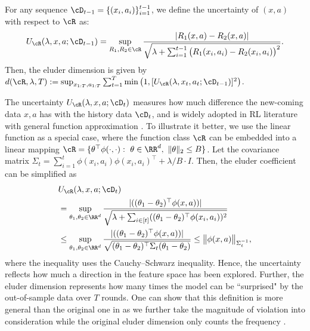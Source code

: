 \documentclass[11pt]{article}
\begin{document}
\begin{definition} \label{def:eluder}
    For any sequence $\cD_{t-1} = \{(x_i, a_i)\}_{i=1}^{t-1}$, we define the uncertainty of $(x, a)$ with respect to $\cR$ as:
    $$
        U_\cR(\lambda, x, a; \cD_{t-1}) = \sup_{R_1, R_2\in\cR} \frac{|R_1(x, a)-R_2(x, a)|}{\sqrt{\lambda + \sum_{i=1}^{t-1}\big(R_1(x_i, a_i) - R_2(x_i, a_i)\big)^2}}.
    $$
    Then, the eluder dimension is given by
    $d(\cR, \lambda, T) := \sup_{x_{1:T}, a_{1:T}} \sum_{t=1}^T \min \big(1, [U_\cR(\lambda, x_t, a_t; \cD_{t - 1})]^2\big)$.
\end{definition}
The uncertainty $U_\cR(\lambda, x, a; \cD_t)$ measures how much difference the new-coming data $x,a$ has with the history data $\cD_t$, and is widely adopted in RL literature with general function approximation \citep{zhang2023mathematical,ye2023corruption, agarwal2023vo,zhao2023nearly}.  To illustrate it better, we use the linear function as a special case, where the function class $\cR$ can be embedded into a linear mapping $\cR=\{\theta^{\top}\phi(\cdot,\cdot):~\theta\in\RR^d,~\|\theta\|_2\le B\}$. Let the covariance matrix $\Sigma_t=\sum_{i=1}^{t}\phi(x_i,a_i)\phi(x_i,a_i)^{\top}+\lambda/B\cdot I$. Then, the eluder coefficient can be simplified as
\begin{equation*}
{
\begin{aligned}
    &U_\cR(\lambda, x, a; \cD_t)\\ 
    &= \sup_{\theta_1,\theta_2\in\RR^d}\frac{|((\theta_1-\theta_2)^{\top}\phi(x,a))|}{\sqrt{\lambda+\sum_{i\in[t]}((\theta_1-\theta_2)^{\top}\phi(x_i,a_i))^2}}\\
    &\le \sup_{\theta_1,\theta_2\in\RR^d}\frac{|((\theta_1-\theta_2)^{\top}\phi(x,a))|}{\sqrt{(\theta_1-\theta_2)^{\top}\Sigma_{t}(\theta_1-\theta_2)}} \le \big\|\phi(x,a)\big\|_{\Sigma_{t}^{-1}},
\end{aligned}}
\end{equation*}
where the inequality uses the Cauchy–Schwarz inequality. Hence, the uncertainty reflects how much a direction in the feature space has been explored. Further, the eluder dimension represents how many times the model can be ``surprised" by the out-of-sample data over $T$ rounds. One can show that this definition is more general than the original one in \cite{russo2013eluder} as we further take the magnitude of violation into consideration while the original eluder dimension only counts the frequency \citep{zhang2023mathematical, xie2022role}.
\end{document}
